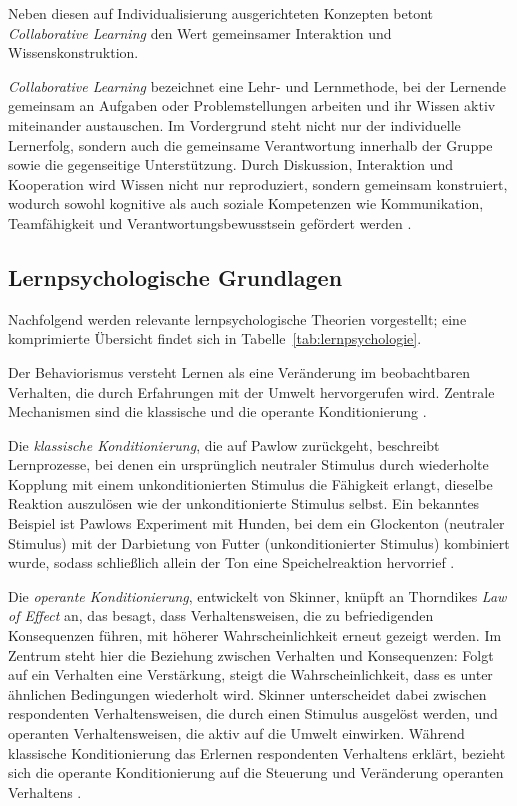 Neben diesen auf Individualisierung ausgerichteten Konzepten betont \textit{Collaborative Learning} den Wert gemeinsamer Interaktion und Wissenskonstruktion.

\textit{Collaborative Learning} bezeichnet eine Lehr- und Lernmethode, bei der Lernende gemeinsam an Aufgaben oder Problemstellungen arbeiten und ihr Wissen aktiv miteinander austauschen. Im Vordergrund steht nicht nur der individuelle Lernerfolg, sondern auch die gemeinsame Verantwortung innerhalb der Gruppe sowie die gegenseitige Unterstützung. Durch Diskussion, Interaktion und Kooperation wird Wissen nicht nur reproduziert, sondern gemeinsam konstruiert, wodurch sowohl kognitive als auch soziale Kompetenzen wie Kommunikation, Teamfähigkeit und Verantwortungsbewusstsein gefördert werden \parencite[S.~486]{laal_benefits_2021}.
\fi

\subsection{Lernpsychologische Grundlagen}\label{chap:3-1-psychology}

Nachfolgend werden relevante lernpsychologische Theorien vorgestellt; eine komprimierte Übersicht findet sich in Tabelle~\ref{tab:lernpsychologie}.

Der Behaviorismus versteht Lernen als eine Veränderung im beobachtbaren Verhalten, die durch Erfahrungen mit der Umwelt hervorgerufen wird. Zentrale Mechanismen sind die klassische und die operante Konditionierung \parencite[S.~15]{pfeiffer_simulationsumgebungen_2008}.

Die \textit{klassische Konditionierung}, die auf Pawlow zurückgeht, beschreibt Lernprozesse, bei denen ein ursprünglich neutraler Stimulus durch wiederholte Kopplung mit einem unkonditionierten Stimulus die Fähigkeit erlangt, dieselbe Reaktion auszulösen wie der unkonditionierte Stimulus selbst. Ein bekanntes Beispiel ist Pawlows Experiment mit Hunden, bei dem ein Glockenton (neutraler Stimulus) mit der Darbietung von Futter (unkonditionierter Stimulus) kombiniert wurde, sodass schließlich allein der Ton eine Speichelreaktion hervorrief \parencite[S.~7ff]{furstenau_lehr-lern-theorien_2019}.

Die \textit{operante Konditionierung}, entwickelt von Skinner, knüpft an Thorndikes \textit{Law of Effect} an, das besagt, dass Verhaltensweisen, die zu befriedigenden Konsequenzen führen, mit höherer Wahrscheinlichkeit erneut gezeigt werden. Im Zentrum steht hier die Beziehung zwischen Verhalten und Konsequenzen: Folgt auf ein Verhalten eine Verstärkung, steigt die Wahrscheinlichkeit, dass es unter ähnlichen Bedingungen wiederholt wird. Skinner unterscheidet dabei zwischen respondenten Verhaltensweisen, die durch einen Stimulus ausgelöst werden, und operanten Verhaltensweisen, die aktiv auf die Umwelt einwirken. Während klassische Konditionierung das Erlernen respondenten Verhaltens erklärt, bezieht sich die operante Konditionierung auf die Steuerung und Veränderung operanten Verhaltens \parencite[S.~15ff]{furstenau_lehr-lern-theorien_2019}.

